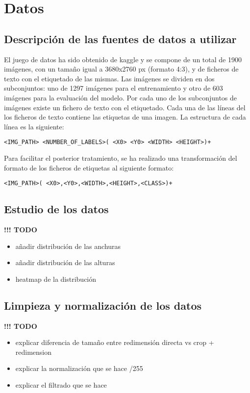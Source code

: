 \section{Datos}


\subsection{Descripción de las fuentes de datos a utilizar}

El juego de datos ha sido obtenido de kaggle \cite{potholedataset} y se compone de un total de 1900 imágenes, con un tamaño igual a 3680x2760 px (formato 4:3), y de ficheros de texto con el etiquetado de las mismas. Las imágenes se dividen en dos subconjuntos: uno de 1297 imágenes para el entrenamiento y otro de 603 imágenes para la evaluación del modelo. Por cada uno de los subconjuntos de imágenes existe un fichero de texto con el etiquetado. Cada una de las líneas del los ficheros de texto contiene las etiquetas de una imagen. La estructura de cada línea es la siguiente:

\begin{lstlisting}[frame=single,basicstyle=\ttfamily\footnotesize]
<IMG_PATH> <NUMBER_OF_LABELS>( <X0> <Y0> <WIDTH> <HEIGHT>)+
\end{lstlisting}

Para facilitar el posterior tratamiento, se ha realizado una transformación del formato de los ficheros de etiquetas al siguiente formato:

\begin{lstlisting}[frame=single,basicstyle=\ttfamily\footnotesize]
<IMG_PATH>( <X0>,<Y0>,<WIDTH>,<HEIGHT>,<CLASS>)+
\end{lstlisting}

\subsection{Estudio de los datos}

\textbf{!!! TODO}
\begin{itemize}
	\item añadir distribución de las anchuras
	\item añadir distribución de las alturas
	\item heatmap de la distribución
\end{itemize}

\subsection{Limpieza y normalización de los datos}

\textbf{!!! TODO}
\begin{itemize}
	\item explicar diferencia de tamaño entre redimensión directa vs crop + redimension
	\item explicar la normalización que se hace /255
	\item explicar el filtrado que se hace
\end{itemize}